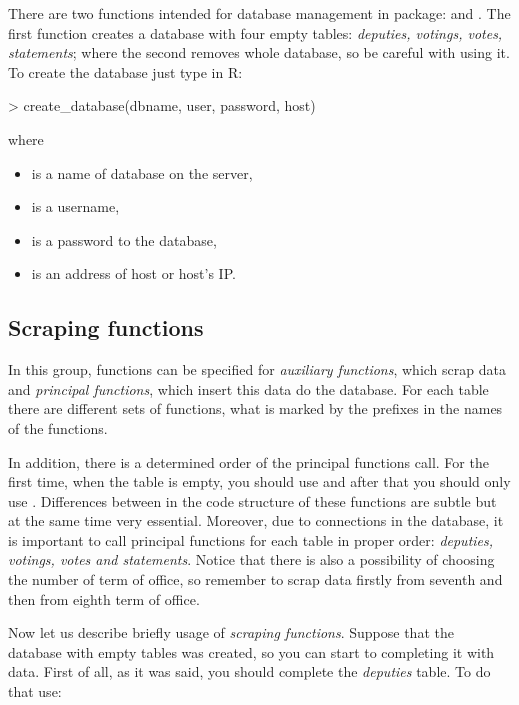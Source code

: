 There are two functions intended for database management in  package:  and . The first function creates a database with four empty tables: \emph{deputies, votings, votes, statements}; where the second removes whole database, so be careful with using it. To create the database just type in R:

\begin{example}
> create_database(dbname, user, password, host)
\end{example}

where

\begin{itemize}
\item {} is a name of database on the server,
\item {} is a username,
\item {} is a password to the database,
\item {} is an address of host or host's IP.
\end{itemize}

\subsection{Scraping functions}

In this group, functions can be specified for \emph{auxiliary functions}, which scrap data and \emph{principal functions}, which insert this data do the database. For each table there are different sets of functions, what is marked by the prefixes in the names of the functions. 

In addition, there is a determined order of the principal functions call. For the first time, when the table is empty, you should use  and after that you should only use . Differences between in the code structure of these functions are subtle but at the same time very essential. Moreover, due to connections in the database, it is important to call principal functions for each table in proper order: \emph{deputies, votings, votes and statements}. Notice that there is also a possibility of choosing the number of term of office, so remember to scrap data firstly from seventh and then from eighth term of office.

Now let us describe briefly usage of \emph{scraping functions}. Suppose that the database with empty tables was created, so you can start to completing it with data. First of all, as it was said, you should complete the \emph{deputies} table. To do that use:

